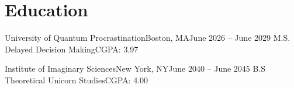 \section{Education}
  \resumeSubHeadingListStart

    \resumeSubheadingEducation
      {University of Quantum Procrastination}{Boston, MA}{June 2026 -- June 2029}
      {M.S. Delayed Decision Making}{CGPA: 3.97}

    \resumeSubheadingEducation
      {Institute of Imaginary Sciences}{New York, NY}{June 2040 -- June 2045}
      {B.S Theoretical Unicorn Studies}{CGPA: 4.00}

  \resumeSubHeadingListEnd

